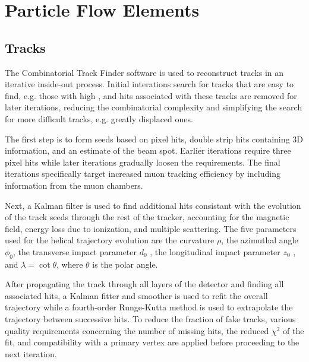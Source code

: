 \section{Particle Flow Elements}
\label{sec:pf_elements}

\subsection{Tracks}
\label{sec:pf_tracks}


The Combinatorial Track Finder software is used to reconstruct tracks in an iterative inside-out process.
Initial interations search for tracks that are easy to find, e.g. those with high \pt, and hits associated with these tracks are removed for later iterations, reducing the combinatorial complexity and simplifying the search for more difficult tracks, e.g. greatly displaced ones.

The first step is to form seeds based on pixel hits, double strip hits containing 3D information, and an estimate of the beam spot.
Earlier iterations require three pixel hits while later iterations gradually loosen the requirements. %
The final iterations specifically target increased muon tracking efficiency by including information from the muon chambers.

Next, a Kalman filter is used to find additional hits consistant with the evolution of the track seeds through the rest of the tracker, accounting for the magnetic field, energy loss due to ionization, and multiple scattering.
The five parameters used for the helical trajectory evolution are the curvature $\rho$, the azimuthal angle $\phi_0$, the transverse impact parameter $d_0$ , the longitudinal impact parameter $z_0$ , and $\lambda = \cot \theta$, where $\theta$ is the polar angle.

After propagating the track through all layers of the detector and finding all associated hits, a Kalman fitter and smoother is used to refit the overall trajectory while a fourth-order Runge-Kutta method is used to extrapolate the trajectory between successive hits.
To reduce the fraction of fake tracks, various quality requirements concerning the number of missing hits, the reduced $\chi^2$ of the fit, and compatibility with a primary vertex are applied before proceeding to the next iteration.


